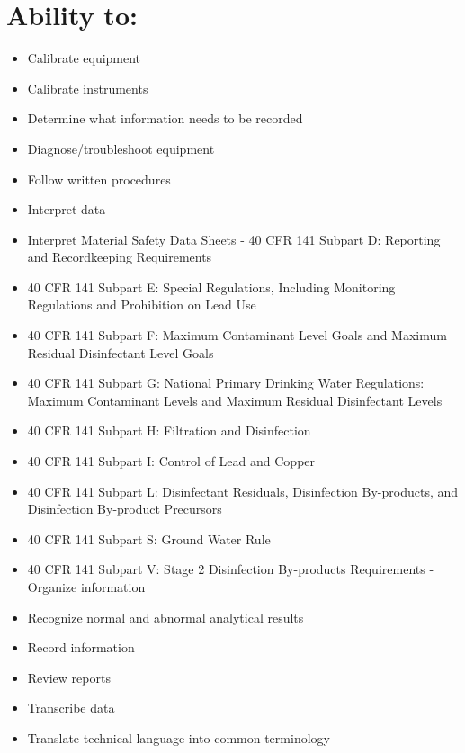 \documentclass[10pt]{article}
\begin{document}
\section{Ability to:}
\begin{itemize}
  \item Calibrate equipment

  \item Calibrate instruments

  \item Determine what information needs to be recorded

  \item Diagnose/troubleshoot equipment

  \item Follow written procedures

  \item Interpret data

  \item Interpret Material Safety Data Sheets - 40 CFR 141 Subpart D: Reporting and Recordkeeping Requirements

  \item 40 CFR 141 Subpart E: Special Regulations, Including Monitoring Regulations and Prohibition on Lead Use

  \item 40 CFR 141 Subpart F: Maximum Contaminant Level Goals and Maximum Residual Disinfectant Level Goals

  \item 40 CFR 141 Subpart G: National Primary Drinking Water Regulations: Maximum Contaminant Levels and Maximum Residual Disinfectant Levels

  \item 40 CFR 141 Subpart H: Filtration and Disinfection

  \item 40 CFR 141 Subpart I: Control of Lead and Copper

  \item 40 CFR 141 Subpart L: Disinfectant Residuals, Disinfection By-products, and Disinfection By-product Precursors

  \item 40 CFR 141 Subpart S: Ground Water Rule

  \item 40 CFR 141 Subpart V: Stage 2 Disinfection By-products Requirements - Organize information

  \item Recognize normal and abnormal analytical results

  \item Record information

  \item Review reports

  \item Transcribe data

  \item Translate technical language into common terminology

\end{itemize}
\end{document}
